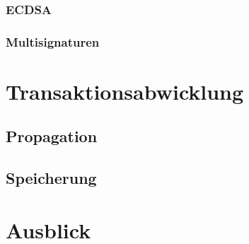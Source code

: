 \documentclass[runningheads]{llncs}
\begin{document}
\subsubsection{ECDSA}
\label{ecdsa}

\subsubsection{Multisignaturen}

\section{Transaktionsabwicklung}

\subsection{Propagation}

\subsection{Speicherung}

\section{Ausblick}



\end{document}
